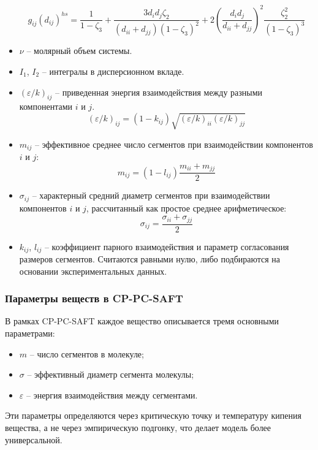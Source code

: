\documentclass[a4paper,12pt]{article}
\begin{document}
\begin{itemize}
\begin{equation}
            g_{ij}(d_{ij})^{hs} = \frac{1}{1 - \zeta_3} + \frac{3d_{i}d_{j}\zeta_2}{(d_{ii} + d_{jj})(1 - \zeta_3)^2} + 2 \left( \frac{d_{i}d_{j}}{d_{ii} + d_{jj}} \right)^2 \frac{\zeta_2^2}{(1 - \zeta_3)^3}
          \end{equation}
        \item $\nu$ -- молярный объем системы.
        \item $I_1$, $I_2$ -- интегралы в дисперсионном вкладе.
        \item $(\varepsilon / k)_{ij}$ -- приведенная энергия взаимодействия между разными компонентами $i$ и $j$. 
          \begin{equation}
              (\varepsilon / k)_{ij} = (1 - k_{ij}) \sqrt{(\varepsilon / k)_{ii} (\varepsilon / k)_{jj}}
          \end{equation}
        \item $m_{ij}$ -- эффективное среднее число сегментов при взаимодействии компонентов $i$ и $j$:
          \[
            m_{ij} = \left(1 - l_{ij}\right) \frac{m_{ii} + m_{jj}}{2}
          \]
        \item $\sigma_{ij}$ -- характерный средний диаметр сегментов при взаимодействии компонентов $i$ и $j$, рассчитанный как простое среднее арифметическое:
          \[
            \sigma_{ij} = \frac{\sigma_{ii} + \sigma_{jj}}{2}
          \]
        \item $k_{ij}$, $l_{ij}$ -- коэффициент парного взаимодействия и параметр согласования размеров сегментов. Считаются равными нулю, либо подбираются на основании экспериментальных данных.
    
    \end{itemize}
    
    \subsubsection{Параметры веществ  в CP-PC-SAFT}

В рамках CP-PC-SAFT каждое вещество описывается тремя основными параметрами:
\begin{itemize}
    \item \( m \) -- число сегментов в молекуле;
    \item \( \sigma \) -- эффективный диаметр сегмента молекулы;
    \item \( \varepsilon \) -- энергия взаимодействия между сегментами.
\end{itemize}

Эти параметры определяются через критическую точку и температуру кипения вещества, а не через эмпирическую подгонку, что делает модель более универсальной.
\end{document}
